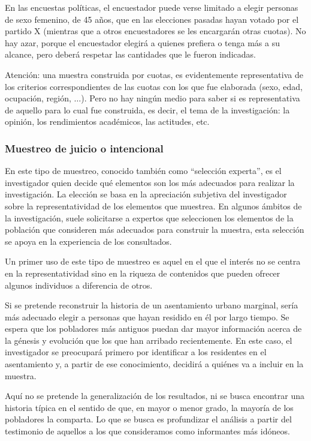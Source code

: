 \documentclass[]{article}
\begin{document}
En las encuestas políticas, el encuestador puede verse limitado a elegir
personas de sexo femenino, de 45 años, que en las elecciones pasadas
hayan votado por el partido X (mientras que a otros encuestadores se les
encargarán otras cuotas). No hay azar, porque el encuestador elegirá a
quienes prefiera o tenga más a su alcance, pero deberá respetar las
cantidades que le fueron indicadas.

Atención: una muestra construida por cuotas, es evidentemente
representativa de los criterios correspondientes de las cuotas con los
que fue elaborada (sexo, edad, ocupación, región, \(\ldots\)). Pero no hay ningún
medio para saber si es representativa de aquello para lo cual fue
construida, es decir, el tema de la investigación: la opinión, los
rendimientos académicos, las actitudes, etc.

\hypertarget{muestreo-de-juicio-o-intencional}{%
\subsubsection{Muestreo de juicio o intencional}\label{muestreo-de-juicio-o-intencional}}

En este tipo de muestreo, conocido también como ``selección experta'', es
el investigador quien decide qué elementos son los más adecuados para
realizar la investigación. La elección se basa en la apreciación
subjetiva del investigador sobre la representatividad de los elementos
que muestrea. En algunos ámbitos de la investigación, suele solicitarse
a expertos que seleccionen los elementos de la población que consideren
más adecuados para construir la muestra, esta selección se apoya en la
experiencia de los consultados.

Un primer uso de este tipo de muestreo es aquel en el que el interés no
se centra en la representatividad sino en la riqueza de contenidos que
pueden ofrecer algunos individuos a diferencia de otros.

Si se pretende reconstruir la historia de un asentamiento urbano
marginal, sería más adecuado elegir a personas que hayan residido en él
por largo tiempo. Se espera que los pobladores más antiguos puedan dar
mayor información acerca de la génesis y evolución que los que han
arribado recientemente. En este caso, el investigador se preocupará
primero por identificar a los residentes en el asentamiento y, a partir
de ese conocimiento, decidirá a quiénes va a incluir en la muestra.

Aquí no se pretende la generalización de los resultados, ni se busca
encontrar una historia típica en el sentido de que, en mayor o menor
grado, la mayoría de los pobladores la comparta. Lo que se busca es
profundizar el análisis a partir del testimonio de aquellos a los que
consideramos como informantes más idóneos.
\end{document}
